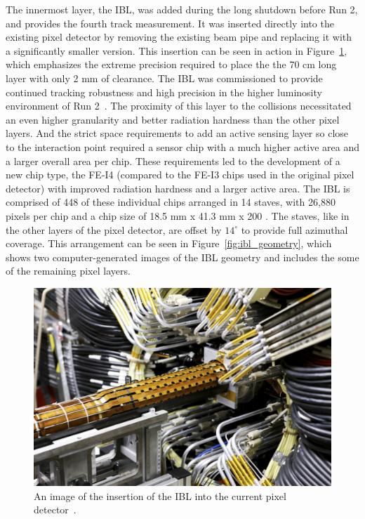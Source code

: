 The innermost layer, the \ac{IBL}, was added during the long shutdown before Run 2, and provides the fourth track measurement.
It was inserted directly into the existing pixel detector by removing the existing beam pipe and replacing it with a significantly smaller version.
This insertion can be seen in action in Figure~\ref{fig:ibl_insertion}, which emphasizes the extreme precision required to place the the 70 cm long layer with only 2 mm of clearance.
The \ac{IBL} was commissioned to provide continued tracking robustness and high precision in the higher luminosity environment of Run 2~\cite{ibl_tdr}.
The proximity of this layer to the collisions necessitated an even higher granularity and better radiation hardness than the other pixel layers.
And the strict space requirements to add an active sensing layer so close to the interaction point required a sensor chip with a much higher active area and a larger overall area per chip.
These requirements led to the development of a new chip type, the FE-I4 (compared to the FE-I3 chips used in the original pixel detector) with improved radiation hardness and a larger active area.
The \ac{IBL} is comprised of 448 of these individual chips arranged in 14 staves, with 26,880 pixels per chip and a chip size of 18.5 mm x 41.3 mm x 200 \um.
The staves, like in the other layers of the pixel detector, are offset by $14^\circ$ to provide full azimuthal coverage.
This arrangement can be seen in Figure~\ref{fig:ibl_geometry}, which shows two computer-generated images of the \ac{IBL} geometry and includes the some of the remaining pixel layers.


\begin{figure}[hbtp]
\centering
\includegraphics[width=\fullfig]{figures/ibl_insertion.jpg}
\caption{An image of the insertion of the \acs*{IBL} into the current pixel detector~\cite{ibl_insert}.}
\label{fig:ibl_insertion}
\end{figure}


